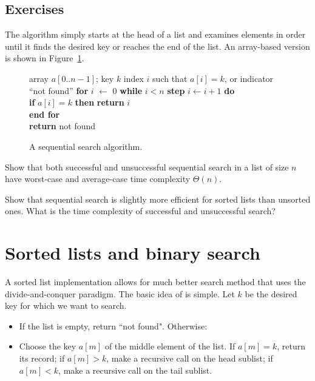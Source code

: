 \subsection*{Exercises}

\begin{Exercise} \label{exr:seq-search}

The  algorithm 
simply starts at the head of a list and examines 
elements in order until it finds the desired key or reaches the end of the list. 
An array-based version is shown in Figure~\ref{seq-search}.

\begin{figure}[htb!]
\hspace*{1.2in}\begin{minipage}{5in}
{array $a[0..n-1]$; key $k$}
{index $i$ such that $a[i] = k$, or indicator ``not found''} 
{
\> \textbf{for} \(i\) $\leftarrow$ 0 \textbf{while} \(i < n\) 
                 \textbf{step} $i \leftarrow i+1$ \textbf{do}\\
\> \>\textbf{if} $a[i] = k$ 
              \textbf{then} \textbf{return} $i$ \\
\> \textbf{end for}\\
\> \textbf{return} \textsf{not found}\\
}
\end{minipage}
\caption{\label{seq-search} A sequential search algorithm.}
\end{figure}

Show that both successful and unsuccessful sequential  search in a list of size 
$n$ have worst-case and average-case time complexity $\Theta(n)$. 
\end{Exercise}

\begin{Exercise} \label{exr:seq-search-sorted}
Show that sequential search is slightly more efficient for sorted lists than 
unsorted ones. What is the time complexity of successful and unsuccessful search?
\end{Exercise}

\section{Sorted lists and binary search}\label{sec:bin:search}

A sorted list implementation allows for much better search method
that uses the divide-and-conquer paradigm. The basic idea of 
 is simple. 
Let $k$ be the desired key for which we want to search.
\begin{itemize}
\item If the list is empty, return ``not found". Otherwise:
\item Choose the key $a[m]$ of the middle element of the list. If $a[m]=k$, return its record; 
if $a[m] > k$, make a recursive call on the head sublist;  if $a[m]<k$, make a 
recursive call on the tail sublist.
\end{itemize}

